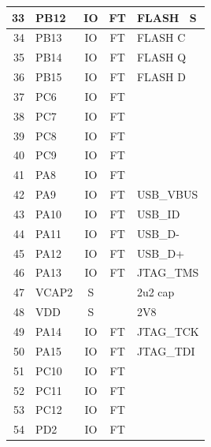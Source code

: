 \documentclass[openbib,letterpaper,10pt]{article}
\begin{document}
\begin{spacing}{1.15}
\begin{appendix}
\begin{singlespacing}
\begin{center}
\begin{longtable}{|r|l|c|c|l|}
			33 & PB12 & IO & FT & FLASH ~S \\ \hline

			34 & PB13 & IO & FT & FLASH C \\ \hline

			35 & PB14 & IO & FT & FLASH Q \\ \hline

			36 & PB15 & IO & FT & FLASH D \\ \hline

			37 & PC6 & IO & FT & \\ \hline

			38 & PC7 & IO & FT & \\ \hline

			39 & PC8 & IO & FT & \\ \hline

			40 & PC9 & IO & FT & \\ \hline

			41 & PA8 & IO & FT & \\ \hline

			42 & PA9 & IO & FT & USB\_VBUS \\ \hline

			43 & PA10 & IO & FT & USB\_ID \\ \hline

			44 & PA11 & IO & FT & USB\_D- \\ \hline

			45 & PA12 & IO & FT & USB\_D+ \\ \hline

			46 & PA13 & IO & FT & JTAG\_TMS \\ \hline

			47 & VCAP2 & S & & 2u2 cap \\ \hline

			48 & VDD & S & & 2V8 \\ \hline

			49 & PA14 & IO & FT & JTAG\_TCK \\ \hline

			50 & PA15 & IO & FT & JTAG\_TDI \\ \hline

			51 & PC10 & IO & FT & \\ \hline

			52 & PC11 & IO & FT & \\ \hline

			53 & PC12 & IO & FT & \\ \hline

			54 & PD2 & IO & FT & \\ \hline


\end{longtable}
\end{center}
\end{singlespacing}
\end{appendix}
\end{spacing}
\end{document}
